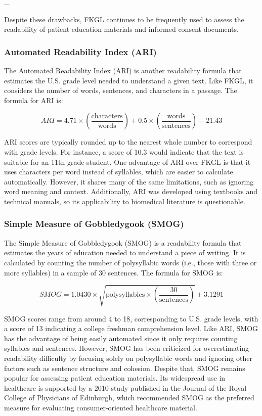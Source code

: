 ...

Despite these drawbacks, FKGL continues to be frequently used to assess the readability of patient education materials and informed consent documents.

\subsubsection{Automated Readability Index (ARI)}

The Automated Readability Index (ARI) is another readability formula that estimates the U.S. grade level needed to understand a given text. Like FKGL, it considers the number of words, sentences, and characters in a passage. The formula for ARI is:

$$ARI = 4.71 \times \left(\frac{\text{characters}}{\text{words}}\right) + 0.5 \times \left(\frac{\text{words}}{\text{sentences}}\right) - 21.43$$

ARI scores are typically rounded up to the nearest whole number to correspond with grade levels. For instance, a score of 10.3 would indicate that the text is suitable for an 11th-grade student.
One advantage of ARI over FKGL is that it uses characters per word instead of syllables, which are easier to calculate automatically. 
However, it shares many of the same limitations, such as ignoring word meaning and context. 
Additionally, ARI was developed using textbooks and technical manuals, so its applicability to biomedical literature is questionable.

\subsubsection{Simple Measure of Gobbledygook (SMOG)}

The Simple Measure of Gobbledygook (SMOG) is a readability formula that estimates the years of education needed to understand a piece of writing. It is calculated by counting the number of polysyllabic words (i.e., those with three or more syllables) in a sample of 30 sentences. 
The formula for SMOG is:

$$SMOG = 1.0430 \times \sqrt{\text{polysyllables} \times \left(\frac{30}{\text{sentences}}\right)} + 3.1291$$

SMOG scores range from around 4 to 18, corresponding to U.S. grade levels, with a score of 13 indicating a college freshman comprehension level.
Like ARI, SMOG has the advantage of being easily automated since it only requires counting syllables and sentences. However, SMOG has been criticized for overestimating readability difficulty by focusing solely on polysyllabic words and ignoring other factors such as sentence structure and cohesion. Despite that, SMOG remains popular for assessing patient education materials. Its widespread use in healthcare is supported by a 2010 study published in the Journal of the Royal College of Physicians of Edinburgh, which recommended SMOG as the preferred measure for evaluating consumer-oriented healthcare material.

